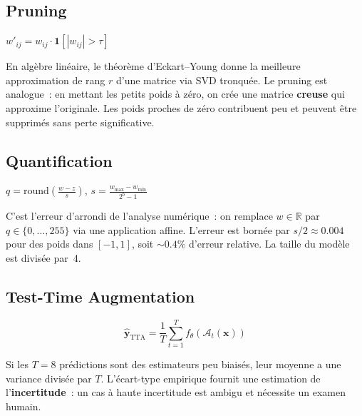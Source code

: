 \documentclass[11pt,a4paper]{article}
\newcommand{\R}{\mathbb{R}}
\newcommand{\Z}{\mathbb{Z}}
\begin{document}
\subsection{Pruning}

$w'_{ij} = w_{ij} \cdot \mathbf{1}[|w_{ij}| > \tau]$

\begin{intubox}
En alg\`ebre lin\'eaire, le th\'eor\`eme d'Eckart--Young donne la meilleure approximation de rang $r$ d'une matrice via SVD tronqu\'ee. Le pruning est analogue~: en mettant les petits poids \`a z\'ero, on cr\'ee une matrice \textbf{creuse} qui approxime l'originale. Les poids proches de z\'ero contribuent peu et peuvent \^etre supprim\'es sans perte significative.
\end{intubox}

\subsection{Quantification}

$q = \text{round}\!\left(\frac{w - z}{s}\right)$, $s = \frac{w_{\max} - w_{\min}}{2^b - 1}$

\begin{intubox}[Discr\'etisation de $\R$ vers $\Z$]
C'est l'erreur d'arrondi de l'analyse num\'erique~: on remplace $w \in \R$ par $q \in \{0,\ldots,255\}$ via une application affine. L'erreur est born\'ee par $s/2 \approx 0.004$ pour des poids dans $[-1,1]$, soit $\sim 0.4\%$ d'erreur relative. La taille du mod\`ele est divis\'ee par~4.
\end{intubox}

\subsection{Test-Time Augmentation}

\begin{equation}
  \boxed{\hat{\mathbf{y}}_{\text{TTA}} = \frac{1}{T} \sum_{t=1}^{T} f_\theta(\mathcal{A}_t(\mathbf{x}))}
\end{equation}

\begin{intubox}
Si les $T=8$ pr\'edictions sont des estimateurs peu biais\'es, leur moyenne a une variance divis\'ee par $T$. L'\'ecart-type empirique fournit une estimation de l'\textbf{incertitude}~: un cas \`a haute incertitude est ambigu et n\'ecessite un examen humain.
\end{intubox}
\end{document}
